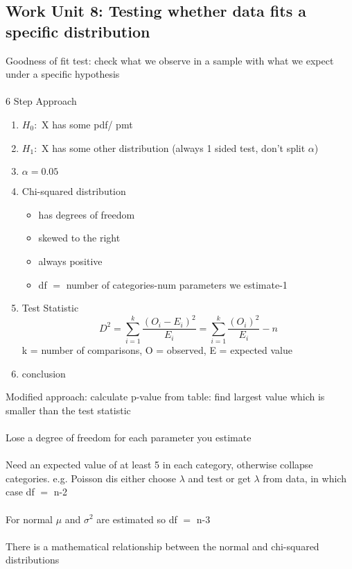 \documentclass[a4paper,10pt]{article}
\begin{document}
\subsection{Work Unit 8: Testing whether data fits a specific distribution}
Goodness of fit test: check what we observe in a sample with what we expect under a specific hypothesis \\ \\
6 Step Approach
\begin{enumerate}
	\item $H_0: $ X has some pdf/ pmt
	\item $H_1: $ X has some other distribution (always 1 sided test, don't split $\alpha$)
	\item $\alpha = 0.05$
	\item Chi-squared distribution
	\begin{itemize}
		\item has degrees of freedom
		\item skewed to the right
		\item always positive
		\item df $=$ number of categories-num parameters we estimate-1
	\end{itemize}
	\item Test Statistic \[ D^2 = \sum^{k}_{i = 1}\frac{(O_i-E_i)^2}{E_i} = \sum^{k}_{i = 1}\frac{(O_i)^2}{E_i} -n \] k = number of comparisons, O = observed, E = expected value
	\item conclusion
\end{enumerate}

Modified approach: calculate p-value from table: find largest value which is smaller than the test statistic \\ \\ Lose a degree of freedom for each parameter you estimate \\ \\ Need an expected value of at least 5 in each category, otherwise collapse categories. e.g. Poisson dis either choose $\lambda$ and test or get $\lambda$ from data, in which case df $= $ n-2 \\ \\ For normal $\mu$ and $\sigma^2$ are estimated so df $=$ n-3
\\ \\
There is a mathematical relationship between the normal and chi-squared distributions
\end{document}
